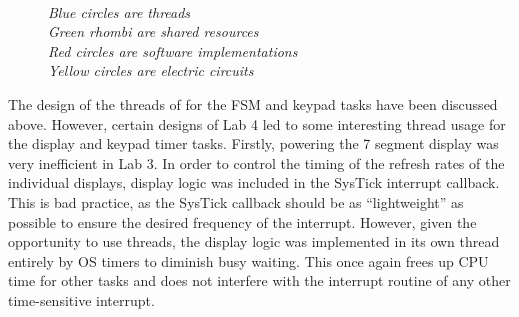 \documentclass[12pt]{report}
\begin{document}
\begin{figure}[h]
\begin{center}
		\\
		\textit{Blue circles are threads}\\
		\textit{Green rhombi are shared resources}\\
		\textit{Red circles are software implementations}\\
		\textit{Yellow circles are electric circuits}\\
	\end{center}
\end{figure}
The design of the threads of for the FSM and keypad tasks have been discussed above. However,
certain designs of Lab 4 led to some interesting thread usage for the display and keypad timer
tasks. Firstly, powering the 7 segment display was very inefficient in Lab 3. In order to control
the timing of the refresh rates of the individual displays, display logic was included in the
SysTick interrupt callback. This is bad practice, as the SysTick callback should be as
``lightweight'' as possible to ensure the desired frequency of the interrupt. However, given the
opportunity to use threads, the display logic was implemented in its own thread entirely by OS
timers to diminish busy waiting. This once again frees up CPU time for other tasks and does not
interfere with the interrupt routine of any other time-sensitive interrupt.\\\\
\end{document}
